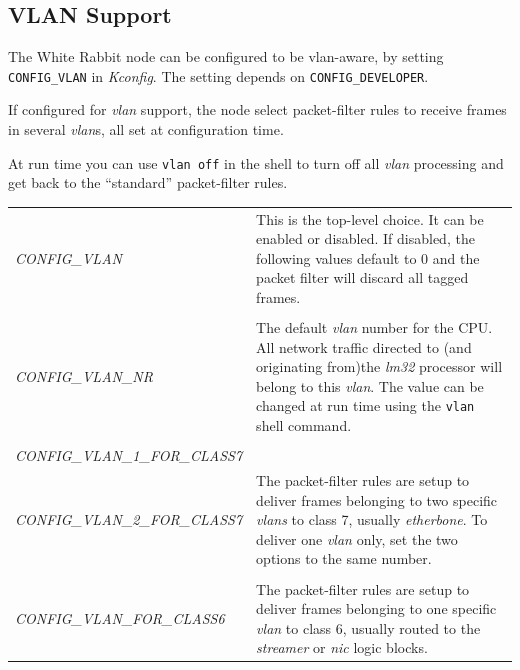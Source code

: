\documentclass[a4paper, 12pt]{article}
\begin{document}
\subsection{VLAN Support}
\label{VLAN Support}

The White Rabbit node can be configured to be vlan-aware, by setting
\texttt{CONFIG\_VLAN} in \textit{Kconfig}.  The setting depends on \texttt{CONFIG\_DEVELOPER}.

If configured for \textit{vlan} support, the node select packet-filter rules
to receive frames in several \textit{vlan}s, all set at configuration time.

At run time you can use \texttt{vlan off} in the shell to turn off all \textit{vlan}
processing and get back to the ``standard'' packet-filter rules.

\begin{longtable}{  p{6.5cm}  p{9cm} }

\textit{ CONFIG\_VLAN } &

	This is the top-level choice. It can be enabled or disabled.
        If disabled, the following values default to 0 and the
        packet filter will discard all tagged frames.\\
& \\
\textit{ CONFIG\_VLAN\_NR } &

	The default \textit{vlan} number for the CPU.  All network traffic
        directed to (and originating from)the \textit{lm32} processor will
        belong to this \textit{vlan}.  The value can be changed at run time
        using the \texttt{vlan} shell command.\\
& \\
\textit{ CONFIG\_VLAN\_1\_FOR\_CLASS7 } & \\
\textit{ CONFIG\_VLAN\_2\_FOR\_CLASS7 } &

	The packet-filter rules are setup to deliver frames belonging
        to two specific \textit{vlans} to class 7, usually \textit{etherbone}.
        To deliver one \textit{vlan} only, set the two options to the same
        number.\\
& \\
\textit{ CONFIG\_VLAN\_FOR\_CLASS6 } &

	The packet-filter rules are setup to deliver frames belonging
        to one specific \textit{vlan} to class 6, usually routed to the
        \textit{streamer} or \textit{nic} logic blocks.\\

\end{longtable}
\end{document}
